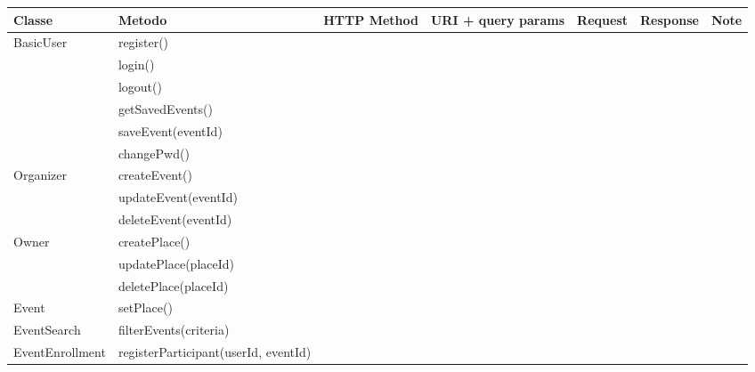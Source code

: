 \documentclass[9pt]{extarticle}
\begin{document}
\begin{table}[!htb]
\begin{tabular}{lllllll}
\toprule
Classe          & Metodo                               & HTTP Method & URI + query params & Request & Response & Note \\ \midrule
BasicUser       & register()                           &             &                    &         &          &      \\
                & login()                              &             &                    &         &          &      \\
                & logout()                             &             &                    &         &          &      \\
                & getSavedEvents()                     &             &                    &         &          &      \\
                & saveEvent(eventId)                   &             &                    &         &          &      \\
                & changePwd()                          &             &                    &         &          &      \\
Organizer       & createEvent()                        &             &                    &         &          &      \\\midrule
                & updateEvent(eventId)                 &             &                    &         &          &      \\
                & deleteEvent(eventId)                 &             &                    &         &          &      \\
Owner           & createPlace()                        &             &                    &         &          &      \\
                & updatePlace(placeId)                 &             &                    &         &          &      \\
                & deletePlace(placeId)                 &             &                    &         &          &      \\\midrule
Event           & setPlace()                           &             &                    &         &          &      \\
EventSearch     & filterEvents(criteria)               &             &                    &         &          &      \\\midrule
EventEnrollment & registerParticipant(userId, eventId) &             &                    &         &          &      \\\midrule

\end{tabular}
\end{table}
\end{document}
